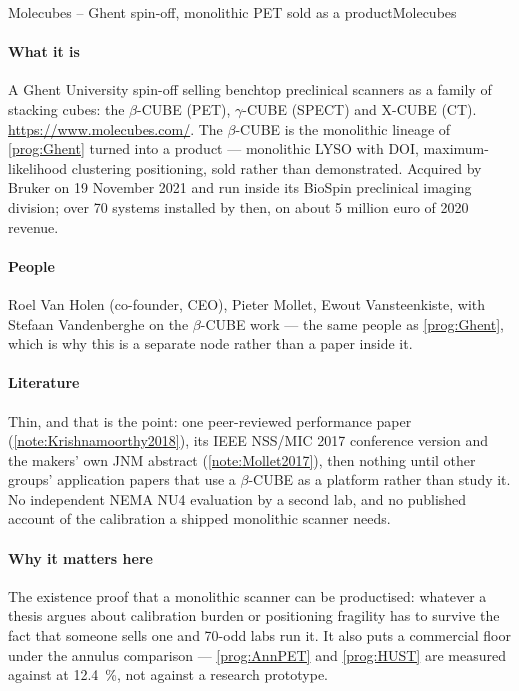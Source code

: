 \begin{programnote}{Molecubes -- Ghent spin-off, monolithic PET sold as a product}{Molecubes}
 
\paragraph{What it is}
A Ghent University spin-off selling benchtop preclinical scanners as a family
of stacking cubes: the $\beta$-CUBE (PET), $\gamma$-CUBE (SPECT) and X-CUBE
(CT). \url{https://www.molecubes.com/}. The $\beta$-CUBE is the monolithic
lineage of \ref{prog:Ghent} turned into a product --- monolithic LYSO with
DOI, maximum-likelihood clustering positioning, sold rather than demonstrated. Acquired by
Bruker on 19 November 2021 and run inside its BioSpin preclinical imaging
division; over 70 systems installed by then, on about 5 million euro of
2020 revenue.
 
\paragraph{People}
Roel Van Holen (co-founder, CEO), Pieter Mollet, Ewout Vansteenkiste, with
Stefaan Vandenberghe on the $\beta$-CUBE work --- the same people as
\ref{prog:Ghent}, which is why this is a separate node rather than a paper
inside it.
 
\paragraph{Literature}
Thin, and that is the point: one peer-reviewed performance paper
(\ref{note:Krishnamoorthy2018}), its IEEE NSS/MIC 2017 conference version and the makers' own JNM
abstract (\ref{note:Mollet2017}), then nothing until other groups' application papers that use a
$\beta$-CUBE as a platform rather than study it. No independent NEMA NU4
evaluation by a second lab, and no published account of the calibration a
shipped monolithic scanner needs.

\paragraph{Why it matters here}
The existence proof that a monolithic scanner can be productised: whatever a
thesis argues about calibration burden or positioning fragility has to survive
the fact that someone sells one and 70-odd labs run it. It also puts a
commercial floor under the annulus comparison --- \ref{prog:AnnPET} and
\ref{prog:HUST} are measured against  at \qty{12.4}{\percent}, not
against a research prototype.
 

\end{programnote}
